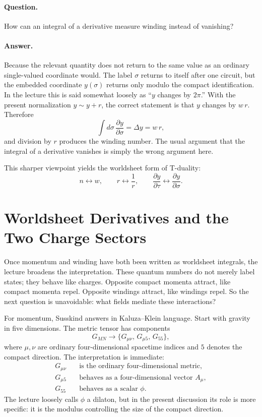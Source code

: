 \paragraph{Question.} How can an integral of a derivative measure winding instead of vanishing?

\paragraph{Answer.} Because the relevant quantity does not return to the same value as an ordinary single-valued coordinate would. The label \(\sigma\) returns to itself after one circuit, but the embedded coordinate \(y(\sigma)\) returns only modulo the compact identification. In the lecture this is said somewhat loosely as ``\(y\) changes by \(2\pi\).'' With the present normalization \(y\sim y+r\), the correct statement is that \(y\) changes by \(w\,r\). Therefore
\begin{equation}
\int d\sigma\,\frac{\partial y}{\partial \sigma}=\Delta y=w\,r,
\end{equation}
and division by \(r\) produces the winding number. The usual argument that the integral of a derivative vanishes is simply the wrong argument here.

This sharper viewpoint yields the worldsheet form of T-duality:
\begin{equation}
n \leftrightarrow w, \qquad r \leftrightarrow \frac{1}{r}, \qquad
\frac{\partial y}{\partial \tau} \leftrightarrow \frac{\partial y}{\partial \sigma}.
\end{equation}

\section{Worldsheet Derivatives and the Two Charge Sectors}

Once momentum and winding have both been written as worldsheet integrals, the lecture broadens the interpretation. These quantum numbers do not merely label states; they behave like charges. Opposite compact momenta attract, like compact momenta repel. Opposite windings attract, like windings repel. So the next question is unavoidable: what fields mediate these interactions?

For momentum, Susskind answers in Kaluza--Klein language. Start with gravity in five dimensions. The metric tensor has components
\begin{equation}
G_{MN}\longrightarrow \{G_{\mu\nu},\,G_{\mu 5},\,G_{55}\},
\end{equation}
where \(\mu,\nu\) are ordinary four-dimensional spacetime indices and \(5\) denotes the compact direction. The interpretation is immediate:
\begin{align}
G_{\mu\nu} &\quad \text{is the ordinary four-dimensional metric},\\
G_{\mu 5} &\quad \text{behaves as a four-dimensional vector } A_\mu,\\
G_{55} &\quad \text{behaves as a scalar } \phi.
\end{align}
The lecture loosely calls \(\phi\) a dilaton, but in the present discussion its role is more specific: it is the modulus controlling the size of the compact direction.

